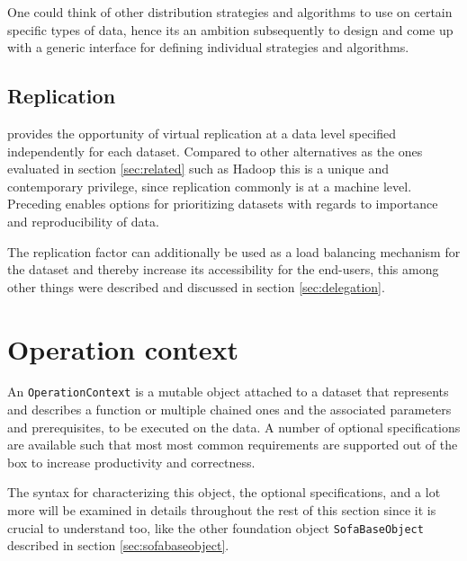 One could think of other distribution strategies and algorithms to use on certain specific types of data, hence its an ambition subsequently to design and come up with a generic interface for defining individual strategies and algorithms.

\subsection{Replication}
\CodeName provides the opportunity of virtual replication at a data level specified independently for each dataset. Compared to other alternatives as the ones evaluated in section \ref{sec:related} such as Hadoop this is a unique and contemporary privilege, since replication commonly is at a machine level. Preceding enables options for prioritizing datasets with regards to importance and reproducibility of data.
\newline

The replication factor can additionally be used as a load balancing mechanism for the dataset and thereby increase its accessibility for the end-users, this among other things were described and discussed in section \ref{sec:delegation}.


\section{Operation context} \label{sec:operation}
An \texttt{OperationContext} is a mutable object attached to a dataset that represents and describes a function or multiple chained ones and the associated parameters and prerequisites, to be executed on the data. A number of optional specifications are available such that most most common requirements are supported out of the box to increase productivity and correctness.
\newline

The syntax for characterizing this object, the optional specifications, and a lot more will be examined in details throughout the rest of this section since it is crucial to understand too, like the other foundation object \texttt{SofaBaseObject} described in section \ref{sec:sofabaseobject}.

